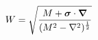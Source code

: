 \begin{equation}
W = \sqrt{\frac{M+\mbox{\boldmath $\sigma$} \cdot \mbox{\boldmath $\nabla$}}{(M^{2} - 
\nabla^{2})^{\frac{1}{2}}}}
\end{equation}


